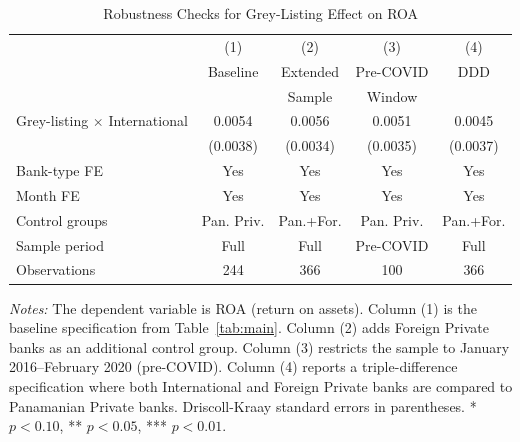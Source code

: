 \begin{table}[H]
\centering
\caption{Robustness Checks for Grey-Listing Effect on ROA}
\label{tab:robustness}
\begin{threeparttable}
\begin{tabular}{lcccc}
\toprule
 & (1) & (2) & (3) & (4) \\
 & Baseline & Extended & Pre-COVID & DDD \\
 & & Sample & Window & \\
\midrule
Grey-listing $\times$ International & 0.0054 & 0.0056 & 0.0051 & 0.0045 \\
 & (0.0038) & (0.0034) & (0.0035) & (0.0037) \\
\midrule
Bank-type FE & Yes & Yes & Yes & Yes \\
Month FE & Yes & Yes & Yes & Yes \\
Control groups & Pan. Priv. & Pan.+For. & Pan. Priv. & Pan.+For. \\
Sample period & Full & Full & Pre-COVID & Full \\
Observations & 244 & 366 & 100 & 366 \\
\bottomrule
\end{tabular}
\begin{tablenotes}[flushleft]
\small
\item \textit{Notes:} The dependent variable is ROA (return on assets). Column (1) is the baseline specification from Table~\ref{tab:main}. Column (2) adds Foreign Private banks as an additional control group. Column (3) restricts the sample to January 2016--February 2020 (pre-COVID). Column (4) reports a triple-difference specification where both International and Foreign Private banks are compared to Panamanian Private banks. Driscoll-Kraay standard errors in parentheses. * $p<0.10$, ** $p<0.05$, *** $p<0.01$.
\end{tablenotes}
\end{threeparttable}
\end{table}
